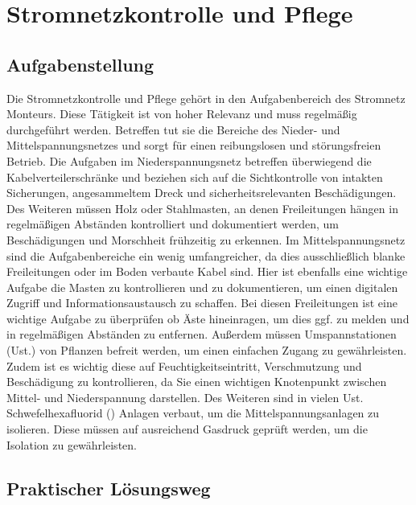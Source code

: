 \chapter{Stromnetzkontrolle und Pflege}
\label{cha:Stromnetzkontrolle}


\section{Aufgabenstellung}

Die Stromnetzkontrolle und Pflege gehört in den Aufgabenbereich des Stromnetz Monteurs. Diese Tätigkeit ist von hoher Relevanz und muss regelmäßig 
durchgeführt werden. Betreffen tut sie die Bereiche des Nieder- und Mittelspannungsnetzes und sorgt für einen reibungslosen und störungsfreien Betrieb. 
Die Aufgaben im Niederspannungsnetz betreffen überwiegend die Kabelverteilerschränke und beziehen sich auf die Sichtkontrolle von intakten Sicherungen, 
angesammeltem Dreck und sicherheitsrelevanten Beschädigungen. Des Weiteren müssen Holz oder Stahlmasten, an denen Freileitungen hängen in regelmäßigen 
Abständen kontrolliert und dokumentiert werden, um Beschädigungen und Morschheit frühzeitig zu erkennen. Im Mittelspannungsnetz sind die Aufgabenbereiche 
ein wenig umfangreicher, da dies ausschließlich blanke Freileitungen oder im Boden verbaute Kabel sind. Hier ist ebenfalls eine wichtige Aufgabe die 
Masten zu kontrollieren und zu dokumentieren, um einen digitalen Zugriff und Informationsaustausch zu schaffen. Bei diesen Freileitungen ist eine 
wichtige Aufgabe zu überprüfen ob Äste hineinragen, um dies ggf. zu melden und in regelmäßigen Abständen zu entfernen. Außerdem müssen 
Umspannstationen (Ust.) von Pflanzen befreit werden, um einen einfachen Zugang zu gewährleisten. Zudem ist es wichtig diese auf Feuchtigkeitseintritt, 
Verschmutzung und Beschädigung zu kontrollieren, da Sie einen wichtigen Knotenpunkt zwischen Mittel- und Niederspannung darstellen. Des Weiteren sind 
in vielen Ust. Schwefelhexafluorid () Anlagen verbaut, um die Mittelspannungsanlagen zu isolieren. Diese müssen auf ausreichend Gasdruck geprüft 
werden, um die Isolation zu gewährleisten.

\section{Praktischer Lösungsweg}

